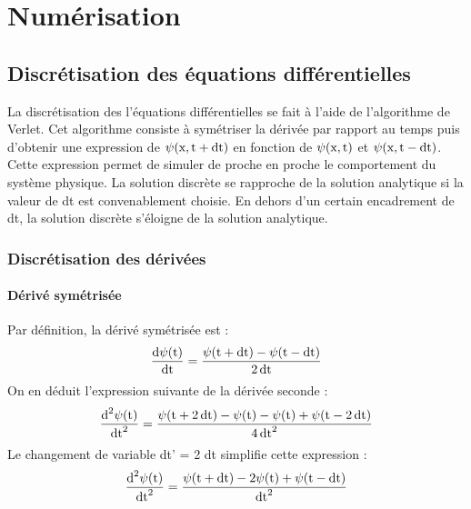 
\chapter{Numérisation}

\section{Discrétisation des équations différentielles} %
%
La discrétisation des l'équations différentielles se fait à l'aide de l'algorithme de Verlet. Cet algorithme consiste à symétriser la dérivée par rapport au temps puis d'obtenir une expression de $\psi(\text{x},\text{t}+\operatorname{dt})$ en fonction de $\psi(\text{x},\text{t})$ et $\psi(\text{x},\text{t}-\operatorname{dt})$. Cette expression permet de simuler de proche en proche le comportement du système physique. La solution discrète se rapproche de la solution analytique si la valeur de dt est convenablement choisie. En dehors d'un certain encadrement de dt, la solution discrète s'éloigne de la solution analytique.
%
\subsection{Discrétisation des dérivées}
%
\subsubsection{Dérivé symétrisée}
Par définition, la dérivé symétrisée est :
\[
\frac{\text{d}\psi(\text{t})}{\operatorname{dt}}=\frac{\psi(\text{t}+\operatorname{dt})-\psi(\text{t}-\operatorname{dt})}{2\operatorname{dt}}
\]
On en déduit l'expression suivante de la dérivée seconde :
\[
\frac{\text{d}^2\psi(\text{t})}{\operatorname{dt}^2}=\frac{\psi (\text{t}+2\operatorname{dt})-\psi (\text{t})-\psi (\text{t})+\psi(\text{t}-2\operatorname{dt})}{4\operatorname{dt}^2}
\]
Le changement de variable dt' = 2 dt simplifie cette expression :
\[
\frac{\text{d}^2\psi(\text{t})}{\operatorname{dt}^2}=\frac{\psi(\text{t}+\operatorname{dt})-2\psi(\text{t})+\psi(\text{t}-\operatorname{dt})}{\operatorname{dt}^2}
\]

